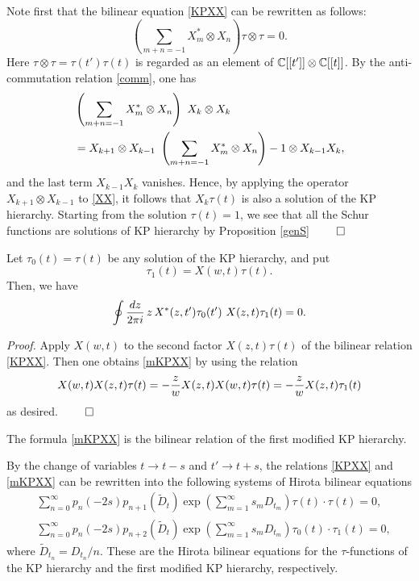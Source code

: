  \quad 
Note first that the bilinear equation
\eqref{KPXX} can be rewritten as follows: 
\begin{equation}\label{XX}
\left(\sum_{m+n=-1} X^{\ast}_{m} \otimes X_{n} \right)
\tau \otimes \tau=0.
\end{equation}
Here $\tau \otimes \tau=\tau(t') \tau(t)$ is regarded as an element of 
${\Bbb C}[[t']] \otimes {\Bbb C}[[t]]$.
By the anti-commutation relation \eqref{comm}, one has
\begin{align}
&\left( \sum_{m+n=-1} X^{\ast}_{m} \otimes X_{n} \right) \ 
X_{k} \otimes X_{k} \\
&=X_{k+1} \otimes X_{k-1} \
\left( \sum_{m+n=-1} X^{\ast}_{m} \otimes X_{n} \right)-
1 \otimes X_{k-1} X_{k}, \notag
\end{align}
and the last term $X_{k-1} X_{k}$ vanishes.
Hence, by applying the operator $X_{k+1} \otimes X_{k-1}$ to 
\eqref{XX}, it follows that $X_{k} \tau(t)$ is also a solution of 
the KP hierarchy. Starting from the solution
$\tau(t)=1$, we see that 
all the Schur functions are solutions of KP hierarchy
by Proposition \ref{genS}
$\qed$
%
\begin{prop}
Let $\tau_0(t)=\tau(t)$ be any solution of the KP hierarchy, and put
\begin{equation}
\tau_1(t)=X(w,t) \tau(t).
\end{equation}
Then, we have 
\begin{equation}\label{mKPXX}
\oint {dz \over 2 \pi i} \,z\,
X^{\ast}(z,t') \tau_0(t') \ 
X(z,t) \tau_1(t)=0.
\end{equation}
\end{prop}
\medskip\noindent
{\em Proof.}\quad
Apply $X(w,t)$ to the second factor 
$X(z,t) \tau(t)$ of the bilinear relation \eqref{KPXX}.
Then one obtains \eqref{mKPXX} by using 
the relation
\begin{equation}
X(w,t) X(z,t) \tau(t)= -{z \over w} X(z,t) X(w,t) \tau(t)=
-{z \over w} X(z,t) \tau_1(t) \notag
\end{equation}
as desired. $\qed$\par
\medskip\noindent
The formula \eqref{mKPXX} is the bilinear relation 
of the first modified KP hierarchy.  
\par\medskip
By the change of variables $t \rightarrow t-s$ and
$t' \rightarrow t+s$, the relations \eqref{KPXX} and \eqref{mKPXX}
can be rewritten into the following systems of 
Hirota bilinear equations 
\begin{align}
&\sum_{n=0}^{\infty} p_{n}(-2 s) p_{n+1}({\widetilde D_t}) 
\exp \left( \sum_{m=1}^{\infty} s_m D_{t_m} \right) \tau(t) \cdot \tau(t)=0, \\
&\sum_{n=0}^{\infty} p_{n}(-2 s) p_{n+2}({\widetilde D_t}) 
\exp \left( \sum_{m=1}^{\infty} s_m D_{t_m} \right) \tau_0(t) \cdot \tau_1(t)=0,
\label{mKPh}
\end{align}
where ${\widetilde D}_{t_n}=D_{t_n} /n$.
These are the Hirota bilinear equations for the $\tau$-functions 
of the KP hierarchy and the first modified KP hierarchy, respectively. 

